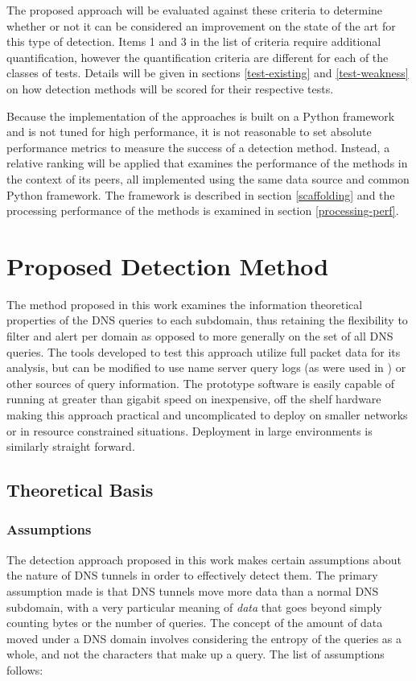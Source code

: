 \documentclass[12pt]{report}
\theoremstyle{remark}
\theoremstyle{definition}
\theoremstyle{definition}
\theoremstyle{definition}
\begin{document}
The proposed approach will be evaluated against these criteria to determine
whether or not it can be considered an improvement on the state of the art for
this type of detection. Items 1 and 3 in the list of criteria require additional
quantification, however the quantification criteria are different for each of
the classes of tests. Details will be given in sections \ref{test-existing} and
\ref{test-weakness} on how detection methods will be scored for their respective
tests.

Because the implementation of the approaches is built on a Python framework and
is not tuned for high performance, it is not reasonable to set absolute
performance metrics to measure the success of a detection method. Instead, a
relative ranking will be applied that examines the performance of the methods
in the context of its peers, all implemented using the same data source and
common Python framework. The framework is described in section \ref{scaffolding}
and the processing performance of the methods is examined in section
\ref{processing-perf}.

\chapter{Proposed Detection Method}
\label{proposed-method}

The method proposed in this work examines the information theoretical properties
of the DNS queries to each subdomain, thus retaining the flexibility to filter
and alert per domain as opposed to more generally on the set of all DNS queries.
The tools developed to test this approach utilize full packet data for its
analysis, but can be modified to use name server query logs (as were used in
\cite{Romana2007}) or other sources of query information. The prototype software
is easily capable of running at greater than gigabit speed on inexpensive, off
the shelf hardware making this approach practical and uncomplicated to deploy on
smaller networks or in resource constrained situations. Deployment in large
environments is similarly straight forward.

\section{Theoretical Basis}
\subsection{Assumptions}
The detection approach proposed in this work
makes certain assumptions about the nature of DNS tunnels in order to
effectively detect them. The primary assumption made is that DNS tunnels move
more data than a normal DNS subdomain, with a very particular meaning of
\emph{data} that goes beyond simply counting bytes or the number of queries. The
concept of the amount of data moved under a DNS domain involves considering the
entropy of the queries as a whole, and not the characters that make up a query.
The list of assumptions follows:
\end{document}
